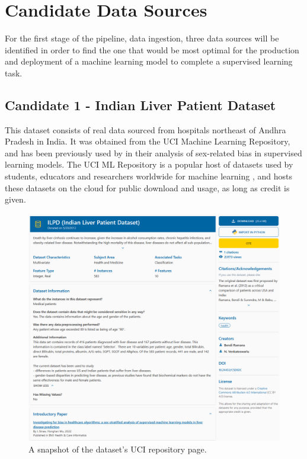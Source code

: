 \documentclass[12pt]{report}
\begin{document}
\chapter{Candidate Data Sources}
For the first stage of the pipeline, data ingestion, three data sources will be identified in order to find 
the one that would be most optimal for the production and deployment of a machine learning model to complete 
a supervised learning task.

\section{Candidate 1 - Indian Liver Patient Dataset}
This dataset \autocite{bendi_ramana_ilpd_2022} consists of real data sourced from hospitals northeast of Andhra Pradesh in India. It was obtained from the
UCI Machine Learning Repository, and has been previously used by \textcite{straw_investigating_2022} in their analysis of sex-related bias in supervised learning models. The UCI ML Repository is a popular host of datasets used by students, 
educators and researchers worldwide for machine learning \autocite{uci_machine_learning_repository_about_nodate}, and hosts these datasets 
on the cloud for public download and usage, as long as credit is given.

\begin{figure}[H]
    \centering
    \includegraphics[width=.75\linewidth]{ILPD-UCI.png}
    \caption{A snapshot of the dataset's UCI repository page.}
    \label{fig:ILPD-UCI}
\end{figure}
\end{document}

